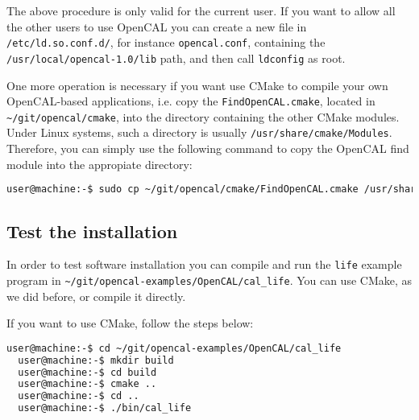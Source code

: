 The above procedure is only valid for the current user. If you want to
allow all the other users to use OpenCAL you can create a new file in
\verb'/etc/ld.so.conf.d/', for instance \verb'opencal.conf',
containing the \verb'/usr/local/opencal-1.0/lib' path, and then call
\verb'ldconfig' as root.

One more operation is necessary if you want use CMake to compile your
own OpenCAL-based applications, i.e. copy the
\verb'FindOpenCAL.cmake', located in \verb'~/git/opencal/cmake', into
the directory containing the other CMake modules. Under Linux systems,
such a directory is usually
\verb'/usr/share/cmake/Modules'. Therefore, you can simply use the
following command to copy the OpenCAL find module into the appropiate
directory:

\begin{lstlisting}[numbers=none,language=bash]
  user@machine:-$ sudo cp ~/git/opencal/cmake/FindOpenCAL.cmake /usr/share/cmake/Modules
\end{lstlisting}


\subsection{Test the installation}\label{sec:installation:test_installation}

In order to test software installation you can compile and run the
\verb'life' example program in
\verb'~/git/opencal-examples/OpenCAL/cal_life'. You can use CMake, as
we did before, or compile it directly.

If you want to use CMake, follow the steps below:

\begin{lstlisting}[numbers=none,language=bash]
  user@machine:-$ cd ~/git/opencal-examples/OpenCAL/cal_life
  user@machine:-$ mkdir build
  user@machine:-$ cd build
  user@machine:-$ cmake ..
  user@machine:-$ cd ..
  user@machine:-$ ./bin/cal_life  
\end{lstlisting}


